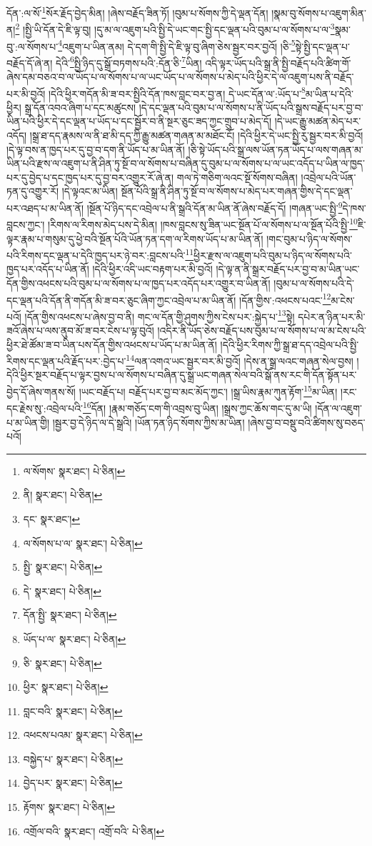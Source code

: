 དོན་:ལ་སོ་\footnote{ལ་སོགས་  སྣར་ཐང་།  པེ་ཅིན། }སོར་རྗོད་བྱེད་མིན། །ཞེས་བརྗོད་ཟིན་ཏོ། །བུམ་པ་སོགས་ཀྱི་དེ་ལྡན་དོན། །སྣམ་བུ་སོགས་པ་འཇུག་མིན་ན།\footnote{ནི།  སྣར་ཐང་།  པེ་ཅིན། } །སྤྱི་ཡི་དོན་དེ་ཇི་ལྟ་བུ། །དུ་མ་ལ་འཇུག་པའི་སྤྱི་དེ་ཡང་གང་སྤྱི་དང་ལྡན་པའི་བུམ་པ་ལ་སོགས་པ་ལ་\footnote{དང་  སྣར་ཐང་། }སྣམ་བུ་:ལ་སོགས་པ་\footnote{ལ་སོགས་པ་ལ་  སྣར་ཐང་།  པེ་ཅིན། }འཇུག་པ་ཡིན་ནམ། དེ་དག་གི་སྤྱི་དེ་ཇི་ལྟ་བུ་ཞིག་ཅེས་སྦྱར་བར་བྱའོ། །ཅི་\footnote{སྤྱི་  སྣར་ཐང་།  པེ་ཅིན། }སྟེ་སྤྱི་དང་ལྡན་པ་བརྗོད་དོ་ཞེ་ན། དེའི་\footnote{དེ་  སྣར་ཐང་།  པེ་ཅིན། }སྤྱི་ཉིད་དུ་སྒྲོ་བཏགས་པའི་:དོན་ཅི་\footnote{དོན་སྤྱི་  སྣར་ཐང་།  པེ་ཅིན། }ཡིན། འདི་ལྟར་ཡོད་པའི་སྒྲ་ནི་སྤྱི་བརྗོད་པའི་ཚིག་གོ་ཞེས་དམ་བཅའ་བ་ལ་ཡོད་པ་ལ་སོགས་པ་ལ་ཡང་ཡོད་པ་ལ་སོགས་པ་མེད་པའི་ཕྱིར་དེ་ལ་འཇུག་པས་ནི་བརྗོད་པར་མི་བྱའོ། །དེའི་ཕྱིར་གདོན་མི་ཟ་བར་སྤྱིའི་དོན་ཁས་བླང་བར་བྱ་ན། དེ་ཡང་དོན་ལ་:ཡོད་པ་\footnote{ཡོད་པ་ལ་  སྣར་ཐང་།  པེ་ཅིན། }མ་ཡིན་པ་དེའི་ཕྱིར། སྒྲ་དོན་འབའ་ཞིག་པ་དང་མཚུངས། །དེ་དང་ལྡན་པའི་བུམ་པ་ལ་སོགས་པ་ནི་ཡོད་པའི་སྒྲས་བརྗོད་པར་བྱ་བ་ཡིན་པའི་ཕྱིར་དེ་དང་ལྡན་པ་ཡོད་པ་དང་སྦྱོར་བ་ནི་སྔར་ཅུང་ཟད་ཀྱང་གྲུབ་པ་མེད་དོ། །དེ་ཡང་རྒྱུ་མཚན་མེད་པར་འདོད། །སྒྲ་ཐ་དད་རྣམས་ལ་ནི་ཐ་མི་དད་ཀྱི་རྒྱུ་མཚན་གཞན་མ་མཐོང་ངོ། །དེའི་ཕྱིར་དེ་ཡང་སྤྱི་རུ་སྦྱར་བར་མི་བྱའོ། །དེ་ལྟ་བས་ན་ཁྱད་པར་དུ་བྱ་བ་དག་ནི་ཡོད་པ་མ་ཡིན་ནོ། །ཅི་སྟེ་ཡོད་པའི་སྒྲ་ལས་ཡོན་ཏན་ཡོད་པ་ལས་གཞན་མ་ཡིན་པའི་རྫས་ལ་འཇུག་པ་ནི་ཤིན་ཏུ་སྔོ་བ་ལ་སོགས་པ་བཞིན་དུ་བུམ་པ་ལ་སོགས་པ་ལ་ཡང་འདོད་པ་ཡིན་ལ་ཁྱད་པར་དུ་བྱེད་པ་དང་ཁྱད་པར་དུ་བྱ་བར་འགྱུར་རོ་ཞེ་ན། གལ་ཏེ་གཅིག་ལའང་སྔོ་སོགས་བཞིན། །འབྲེལ་པའི་ཡོན་ཏན་དུ་འགྱུར་རོ། །དེ་ལྟའང་མ་ཡིན། སྔོན་པོའི་སྒྲ་ནི་ཤིན་ཏུ་སྔོ་བ་ལ་སོགས་པ་མེད་པར་གཞན་གྱིས་དེ་དང་ལྡན་པར་འཐད་པ་མ་ཡིན་ནོ། །སྔོན་པོ་ཉིད་དང་འབྲེལ་པ་ནི་སྒྲའི་དོན་མ་ཡིན་ནོ་ཞེས་བརྗོད་དོ། །གཞན་ཡང་སྤྱི་\footnote{ཅི་  སྣར་ཐང་།  པེ་ཅིན། }དེ་ཁས་བླངས་ཀྱང་། །རིགས་ལ་རིགས་མེད་པས་དེ་མིན། །ཁས་བླངས་སུ་ཟིན་ཡང་སྔོན་པོ་ལ་སོགས་པ་ལ་སྔོན་པོའི་སྤྱི་\footnote{ཕྱིར་  སྣར་ཐང་།  པེ་ཅིན། }ཇི་ལྟར་རྣམ་པ་གསུམ་དུ་ཕྱེ་བའི་སྔོན་པོའི་ཡོན་ཏན་དག་ལ་རིགས་ཡོད་པ་མ་ཡིན་ནོ། །གང་བུམ་པ་ཉིད་ལ་སོགས་པའི་རིགས་དང་ལྡན་པ་དེའི་ཁྱད་པར་ཉེ་བར་:བླངས་པའི་\footnote{བླང་བའི་  སྣར་ཐང་།  པེ་ཅིན། }ཕྱིར་རྫས་ལ་འཇུག་པའི་བུམ་པ་ཉིད་ལ་སོགས་པའི་ཁྱད་པར་འདོད་པ་ཡིན་ནོ། །དེའི་ཕྱིར་འདི་ཡང་བརྟག་པར་མི་བྱའོ། །དེ་ལྟ་ན་ནི་སྒྲར་བརྗོད་པར་བྱ་བ་མ་ཡིན་ཡང་དོན་གྱིས་འཕངས་པའི་བུམ་པ་ལ་སོགས་པ་ལ་ཁྱད་པར་འདོད་པར་འགྱུར་བ་ཡིན་ནོ། །བུམ་པ་ལ་སོགས་པའི་དེ་དང་ལྡན་པའི་དོན་ནི་གདོན་མི་ཟ་བར་ཅུང་ཞིག་ཀྱང་འབྲེལ་པ་མ་ཡིན་ནོ། །དོན་གྱིས་:འཕངས་པའང་\footnote{འཕངས་པའམ་  སྣར་ཐང་།  པེ་ཅིན། }མ་ངེས་པའོ། །དོན་གྱིས་འཕངས་པ་ཞེས་བྱ་བ་ནི། གང་ལ་དོན་གྱི་ཤུགས་ཀྱིས་ངེས་པར་:སྐྱེད་པ་\footnote{བསྐྱེད་པ་  སྣར་ཐང་།  པེ་ཅིན། }སྟེ། དཔེར་ན་ཉིན་པར་མི་ཟའོ་ཞེས་པ་ལས་ནུབ་མོ་ཟ་བར་ངེས་པ་ལྟ་བུའོ། །འདིར་ནི་ཡོད་ཅེས་བརྗོད་པས་བུམ་པ་ལ་སོགས་པ་ལ་མ་ངེས་པའི་ཕྱིར་ཐེ་ཚོམ་ཟ་བ་ཡིན་པས་དོན་གྱིས་འཕངས་པ་ཡོད་པ་མ་ཡིན་ནོ། །དེའི་ཕྱིར་རིགས་ཀྱི་སྒྲ་ཐ་དད་འབྲེལ་པའི་སྤྱི་རིགས་དང་ལྡན་པའི་རྗོད་པར་:བྱེད་པ་\footnote{བྱེད་པར་  སྣར་ཐང་།  པེ་ཅིན། }ལན་འགའ་ཡང་སྦྱར་བར་མི་བྱའོ། །དེས་ན་སྒྲ་ལའང་གཞན་སེལ་བྱས། །དེའི་ཕྱིར་སྔར་བརྗོད་པ་ལྟར་བྱས་པ་ལ་སོགས་པ་བཞིན་དུ་སྒྲ་ཡང་གཞན་སེལ་བའི་སྒོ་ནས་རང་གི་དོན་སྟོན་པར་བྱེད་དོ་ཞེས་གནས་སོ། །ཡང་བརྗོད་པ། བརྗོད་པར་བྱ་བ་མང་མོད་ཀྱང་། །སྒྲ་ཡིས་རྣམ་ཀུན་རྟོག་\footnote{རྟོགས་  སྣར་ཐང་།  པེ་ཅིན། }མ་ཡིན། །རང་དང་རྗེས་སུ་:འབྲེལ་པའི་\footnote{འགྲོལ་བའི་  སྣར་ཐང་། འགྲོ་བའི་  པེ་ཅིན། }དོན། །རྣམ་གཅོད་ངག་གི་འབྲས་བུ་ཡིན། །སྒྲས་ཀྱང་ཆོས་གང་དུ་མ་ཡི། །དོན་ལ་འཇུག་པ་མ་ཡིན་གྱི། །སྦྱར་བྱ་དེ་ཉིད་ལ་དེ་སྒྲའི། །ཡོན་ཏན་ཉིད་སོགས་ཀྱིས་མ་ཡིན། །ཞེས་བྱ་བ་བསྡུ་བའི་ཚིགས་སུ་བཅད་པའོ། 